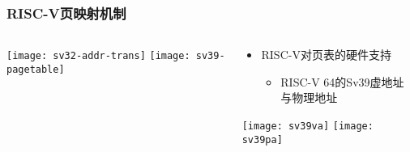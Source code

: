 \begin{frame}   
	\frametitle{RISC-V页映射机制}
	
	\begin{columns}[t]
		
		\begin{column}{.4\textwidth}
			
			\centering
			\texttt{[image: sv32-addr-trans]}
			\texttt{[image: sv39-pagetable]}
			
		\end{column}
		
		
		\begin{column}{.6\textwidth}
			
			\begin{itemize}\large
				\item RISC-V对页表的硬件支持
				\begin{itemize}
					\item RISC-V 64的Sv39虚地址与物理地址
					
					
				\end{itemize}
			\end{itemize}
			
			\texttt{[image: sv39va]} \pause
			\texttt{[image: sv39pa]}
			
		\end{column}
		
		
	\end{columns}
	
\end{frame}


